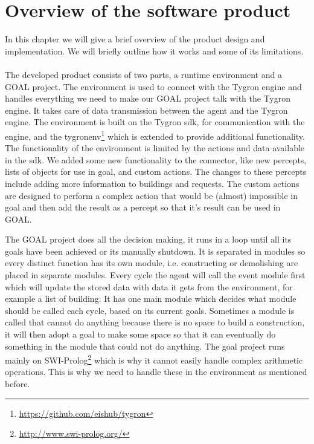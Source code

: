 \chapter{Overview of the software product}\label{ch:overview}
In this chapter we will give a brief overview of the product design and implementation. We will briefly outline how it works and some of its limitations.
\\
\\
The developed product consists of two parts, a runtime environment and a GOAL project.
The environment is used to connect with the Tygron engine and handles everything we need to make our GOAL project talk with the Tygron engine.
It takes care of data transmission between the agent and the Tygron engine.
The environment is built on the Tygron sdk, for communication with the engine, and the tygronenv\footnote{\url{https://github.com/eishub/tygron}} which is extended to provide additional functionality.
The functionality of the environment is limited by the actions and data available in the sdk.
We added some new functionality to the connector, like new percepts, lists of objects for use in goal, and custom actions.
The changes to these percepts include adding more information to buildings and requests.
The custom actions are designed to perform a complex action that would be (almost) impossible in goal and then add the result as a percept so that it's result can be used in GOAL.

The GOAL project does all the decision making, it runs in a loop until all its goals have been achieved or its manually shutdown.
It is separated in modules so every distinct function has its own module, i.e. constructing or demolishing are placed in separate modules.
Every cycle the agent will call the event module first which will update the stored data with data it gets from the environment, for example a list of building.
It has one main module which decides what module should be called each cycle, based on its current goals.
Sometimes a module is called that cannot do anything because there is no space to build a construction, it will then adopt a goal to make some space so that it can eventually do something in the module that could not do anything.
The goal project runs mainly on SWI-Prolog\footnote{\url{http://www.swi-prolog.org/}} which is why it cannot easily handle complex arithmetic operations. 
This is why we need to handle these in the environment as mentioned before.

